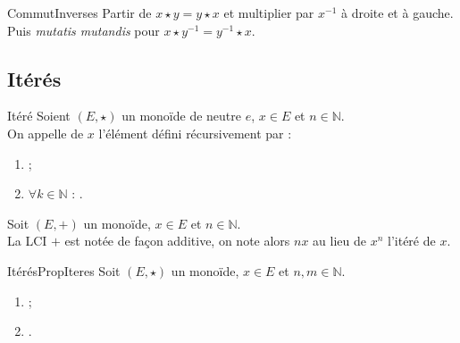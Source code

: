 \documentclass[12pt,a4paper]{report}
\begin{document}
    \begin{principedemo}{CommutInverses}
    Partir de $x \star y = y \star x$ et multiplier par $x^{-1}$ à droite et à gauche. Puis \textit{mutatis mutandis} pour $x \star y^{-1} = y^{-1} \star x$.
    \end{principedemo}
    
    \pagebreak
    
    \subsection{Itérés}
    
    \begin{definition}{Itéré}{}
    Soient $(E, \star)$ un monoïde de neutre $e$, $x \in E$ et $n \in \mathbb{N}$.\\
    On appelle  de $x$ l'élément  défini récursivement par :
    \begin{multicols}{2}
    \begin{enumerate}[label=\bfseries\arabic*)]
        \item {} ;
        \item $\forall k \in \mathbb{N}$ : .
    \end{enumerate}
    \end{multicols}
    \end{definition}
    
    \begin{remarque}
    Soit $(E, +)$ un monoïde, $x \in E$ et $n \in \mathbb{N}$.\\
    La LCI $+$ est notée de façon additive, on note alors $nx$ au lieu de $x^n$ l'itéré de $x$.
    \end{remarque}
    
    \begin{propositions}{Itérés}{PropIteres}
    Soit $(E, \star)$ un monoïde, $x \in E$ et $n, m \in \mathbb{N}$.
    \begin{multicols}{2}
    \begin{enumerate}[label=\bfseries\arabic*)]
        \item {} ;
        \item {}.
    \end{enumerate}
    \end{multicols}
    \end{propositions}
    
\end{document}
